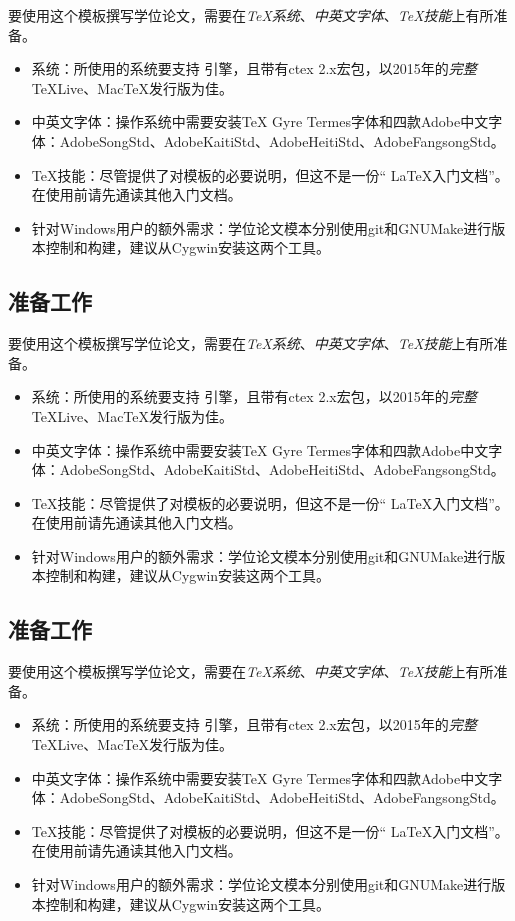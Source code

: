 要使用这个模板撰写学位论文，需要在\emph{TeX系统}、\emph{中英文字体}、\emph{TeX技能}上有所准备。

\begin{itemize}[noitemsep,topsep=0pt,parsep=0pt,partopsep=0pt]
	\item 系统：所使用的系统要支持 引擎，且带有ctex 2.x宏包，以2015年的\emph{完整}TeXLive、MacTeX发行版为佳。
	\item 中英文字体：操作系统中需要安装TeX Gyre Termes字体和四款Adobe中文字体：AdobeSongStd、AdobeKaitiStd、AdobeHeitiStd、AdobeFangsongStd。
	\item TeX技能：尽管提供了对模板的必要说明，但这不是一份“ \LaTeX 入门文档”。在使用前请先通读其他入门文档。
	\item 针对Windows用户的额外需求：学位论文模本分别使用git和GNUMake进行版本控制和构建，建议从Cygwin安装这两个工具。
\end{itemize}

\subsection{准备工作}
\label{sec:requirements}

要使用这个模板撰写学位论文，需要在\emph{TeX系统}、\emph{中英文字体}、\emph{TeX技能}上有所准备。

\begin{itemize}[noitemsep,topsep=0pt,parsep=0pt,partopsep=0pt]
	\item 系统：所使用的系统要支持 引擎，且带有ctex 2.x宏包，以2015年的\emph{完整}TeXLive、MacTeX发行版为佳。
	\item 中英文字体：操作系统中需要安装TeX Gyre Termes字体和四款Adobe中文字体：AdobeSongStd、AdobeKaitiStd、AdobeHeitiStd、AdobeFangsongStd。
	\item TeX技能：尽管提供了对模板的必要说明，但这不是一份“ \LaTeX 入门文档”。在使用前请先通读其他入门文档。
	\item 针对Windows用户的额外需求：学位论文模本分别使用git和GNUMake进行版本控制和构建，建议从Cygwin安装这两个工具。
\end{itemize}

\subsection{准备工作}
\label{sec:requirements}

要使用这个模板撰写学位论文，需要在\emph{TeX系统}、\emph{中英文字体}、\emph{TeX技能}上有所准备。

\begin{itemize}[noitemsep,topsep=0pt,parsep=0pt,partopsep=0pt]
	\item 系统：所使用的系统要支持 引擎，且带有ctex 2.x宏包，以2015年的\emph{完整}TeXLive、MacTeX发行版为佳。
	\item 中英文字体：操作系统中需要安装TeX Gyre Termes字体和四款Adobe中文字体：AdobeSongStd、AdobeKaitiStd、AdobeHeitiStd、AdobeFangsongStd。
	\item TeX技能：尽管提供了对模板的必要说明，但这不是一份“ \LaTeX 入门文档”。在使用前请先通读其他入门文档。
	\item 针对Windows用户的额外需求：学位论文模本分别使用git和GNUMake进行版本控制和构建，建议从Cygwin安装这两个工具。
\end{itemize}

